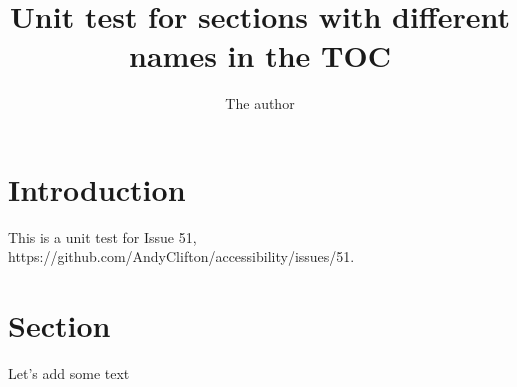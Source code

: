 \documentclass{article}
\title{Unit test for sections with different names in the TOC}
\author{The author}
\begin{document}
\maketitle

\tableofcontents

\section[Introduction]{Introduction}
This is a unit test for Issue 51, https://github.com/AndyClifton/accessibility/issues/51.

\section[Sect.]{Section}
Let's add some text
\end{document}
